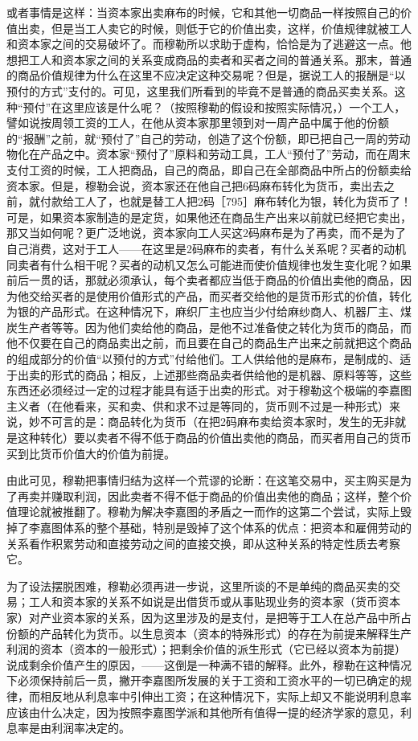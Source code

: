 或者事情是这样：当资本家出卖麻布的时候，它和其他一切商品一样按照自己的价值出卖，但是当工人卖它的时候，则低于它的价值出卖，这样，价值规律就被工人和资本家之间的交易破坏了。而穆勒所以求助于虚构，恰恰是为了逃避这一点。他想把工人和资本家之间的关系变成商品的卖者和买者之间的普通关系。那末，普通的商品价值规律为什么在这里不应决定这种交易呢？但是，据说工人的报酬是“以预付的方式”支付的。可见，这里我们所看到的毕竟不是普通的商品买卖关系。这种“预付”在这里应该是什么呢？（按照穆勒的假设和按照实际情况，）一个工人，譬如说按周领工资的工人，在他从资本家那里领到对一周产品中属于他的份额的“报酬”之前，就“预付了”自己的劳动，创造了这个份额，即已把自己一周的劳动物化在产品之中。资本家“预付了”原料和劳动工具，工人“预付了”劳动，而在周末支付工资的时候，工人把商品，自己的商品，即自己在全部商品中所占的份额卖给资本家。但是，穆勒会说，资本家还在他自己把6码麻布转化为货币，卖出去之前，就付款给工人了，也就是替工人把2码［795］麻布转化为银，转化为货币了！可是，如果资本家制造的是定货，如果他还在商品生产出来以前就已经把它卖出，那又当如何呢？更广泛地说，资本家向工人买这2码麻布是为了再卖，而不是为了自己消费，这对于工人——在这里是2码麻布的卖者，有什么关系呢？买者的动机同卖者有什么相干呢？买者的动机又怎么可能进而使价值规律也发生变化呢？如果前后一贯的话，那就必须承认，每个卖者都应当低于商品的价值出卖他的商品，因为他交给买者的是使用价值形式的产品，而买者交给他的是货币形式的价值，转化为银的产品形式。在这种情况下，麻织厂主也应当少付给麻纱商人、机器厂主、煤炭生产者等等。因为他们卖给他的商品，是他不过准备使之转化为货币的商品，而他不仅要在自己的商品卖出之前，而且要在自己的商品生产出来之前就把这个商品的组成部分的价值“以预付的方式”付给他们。工人供给他的是麻布，是制成的、适于出卖的形式的商品；相反，上述那些商品卖者供给他的是机器、原料等等，这些东西还必须经过一定的过程才能具有适于出卖的形式。对于穆勒这个极端的李嘉图主义者（在他看来，买和卖、供和求不过是等同的，货币则不过是一种形式）来说，妙不可言的是：商品转化为货币（在把2码麻布卖给资本家时，发生的无非就是这种转化）要以卖者不得不低于商品的价值出卖他的商品，而买者用自己的货币买到比货币价值大的价值为前提。

由此可见，穆勒把事情归结为这样一个荒谬的论断：在这笔交易中，买主购买是为了再卖并赚取利润，因此卖者不得不低于商品的价值出卖他的商品；这样，整个价值理论就被推翻了。穆勒为解决李嘉图的矛盾之一而作的这第二个尝试，实际上毁掉了李嘉图体系的整个基础，特别是毁掉了这个体系的优点：把资本和雇佣劳动的关系看作积累劳动和直接劳动之间的直接交换，即从这种关系的特定性质去考察它。

为了设法摆脱困难，穆勒必须再进一步说，这里所谈的不是单纯的商品买卖的交易；工人和资本家的关系不如说是出借货币或从事贴现业务的资本家（货币资本家）对产业资本家的关系，因为这里涉及的是支付，是把等于工人在总产品中所占份额的产品转化为货币。以生息资本（资本的特殊形式）的存在为前提来解释生产利润的资本（资本的一般形式）；把剩余价值的派生形式（它已经以资本为前提）说成剩余价值产生的原因，——这倒是一种满不错的解释。此外，穆勒在这种情况下必须保持前后一贯，撇开李嘉图所发展的关于工资和工资水平的一切已确定的规律，而相反地从利息率中引伸出工资；在这种情况下，实际上却又不能说明利息率应该由什么决定，因为按照李嘉图学派和其他所有值得一提的经济学家的意见，利息率是由利润率决定的。

